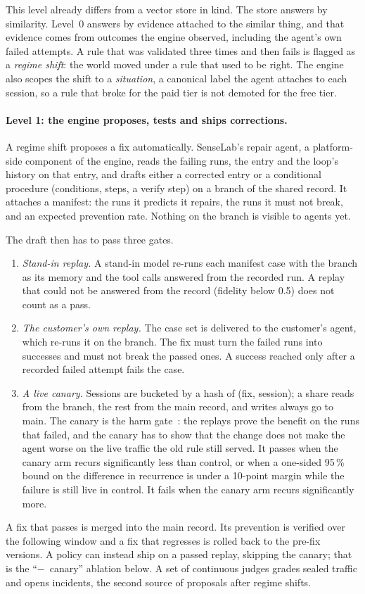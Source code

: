 \documentclass[11pt]{article}
\begin{document}
This level already differs from a vector store in kind. The store answers by similarity. Level~0
answers by evidence attached to the similar thing, and that evidence comes from outcomes the
engine observed, including the agent's own failed attempts. A rule that was validated three
times and then fails is flagged as a \emph{regime shift}: the world moved under a rule that used
to be right. The engine also scopes the shift to a \emph{situation}, a canonical label the agent
attaches to each session, so a rule that broke for the paid tier is not demoted for the free
tier.

\paragraph{Level 1: the engine proposes, tests and ships corrections.} A regime shift proposes a
fix automatically. SenseLab's repair agent, a platform-side component of the engine, reads the
failing runs, the entry and the loop's history on that entry, and drafts either a corrected
entry or a conditional procedure (conditions, steps, a verify step) on a branch of the shared
record. It attaches a manifest: the runs it predicts it repairs, the runs it must not break, and
an expected prevention rate. Nothing on the branch is visible to agents yet.

The draft then has to pass three gates.
\begin{enumerate}[leftmargin=1.6em, itemsep=2pt]
\item \emph{Stand-in replay.} A stand-in model re-runs each manifest case with the branch as its
memory and the tool calls answered from the recorded run. A replay that could not be answered
from the record (fidelity below 0.5) does not count as a pass.
\item \emph{The customer's own replay.} The case set is delivered to the customer's agent, which
re-runs it on the branch. The fix must turn the failed runs into successes and must not break the
passed ones. A success reached only after a recorded failed attempt fails the case.
\item \emph{A live canary.} Sessions are bucketed by a hash of (fix, session); a share reads from
the branch, the rest from the main record, and writes always go to main. The canary is the harm
gate~\cite{kohavi}: the replays prove the benefit on the runs that failed, and the canary has to
show that the change does not make the agent worse on the live traffic the old rule still
served. It passes
when the canary arm recurs significantly less than control, or when a one-sided 95\,\% bound on
the difference in recurrence is under a 10-point margin while the failure is still live in
control. It fails when the canary arm recurs significantly more.
\end{enumerate}
A fix that passes is merged into the main record. Its prevention is verified over the following
window and a fix that regresses is rolled back to the pre-fix versions. A policy can instead
ship on a passed replay, skipping the canary; that is the ``$-$~canary'' ablation below. A set
of continuous judges grades sealed traffic and opens incidents, the second source of proposals
after regime shifts.
\end{document}
